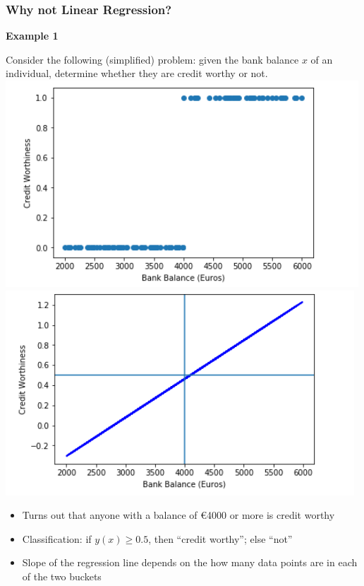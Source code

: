 \documentclass[xcolor=table]{beamer}
\begin{document}
\begin{frame}[t]
\frametitle{Why not Linear Regression?}
\textbf{Example 1}

Consider the following (simplified) problem: given the bank balance $x$ of an individual, determine whether they are credit worthy or not.
\includegraphics[scale=0.3]{bb_cw1.png}
\includegraphics[scale=0.3]{lin_reg_bb_cw1.png}

\begin{itemize}
	\item Turns out that anyone with a balance of \euro 4000 or more is credit worthy
	
	\item Classification: if $y(x) \geq 0.5$, then ``credit worthy''; else ``not''
	
	\item Slope of the regression line depends on the how many data points are in each of the two buckets
\end{itemize}
\end{frame}
\end{document}
